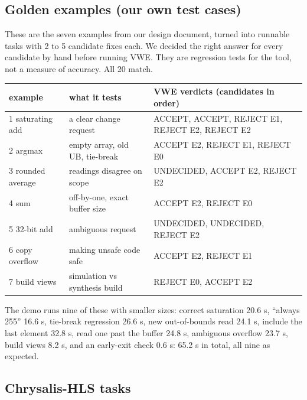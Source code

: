 \documentclass[10pt,a4paper]{article}
\begin{document}
\subsection{Golden examples (our own test cases)}
These are the seven examples from our design document, turned into runnable tasks with 2 to 5
candidate fixes each. We decided the right answer for every candidate by hand before running VWE.
They are regression tests for the tool, not a measure of accuracy. All 20 match.
\begin{center}\small
\begin{tabular}{@{}lll@{}}\toprule
example & what it tests & VWE verdicts (candidates in order)\\\midrule
1 saturating add & a clear change request & ACCEPT, ACCEPT, REJECT E1, REJECT E2, REJECT E2\\
2 argmax & empty array, old UB, tie-break & ACCEPT E2, REJECT E1, REJECT E0\\
3 rounded average & readings disagree on scope & UNDECIDED, ACCEPT E2, REJECT E2\\
4 sum & off-by-one, exact buffer size & ACCEPT E2, REJECT E0\\
5 32-bit add & ambiguous request & UNDECIDED, UNDECIDED, REJECT E2\\
6 copy overflow & making unsafe code safe & ACCEPT E2, REJECT E1\\
7 build views & simulation vs synthesis build & REJECT E0, ACCEPT E2\\\bottomrule
\end{tabular}\end{center}
The demo runs nine of these with smaller sizes: correct saturation 20.6 s, ``always 255'' 16.6 s,
tie-break regression 26.6 s, new out-of-bounds read 24.1 s, include the last element 32.8 s, read
one past the buffer 24.8 s, ambiguous overflow 23.7 s, build views 8.2 s, and an early-exit check
0.6 s: 65.2 s in total, all nine as expected.

\subsection{Chrysalis-HLS tasks}
\end{document}
